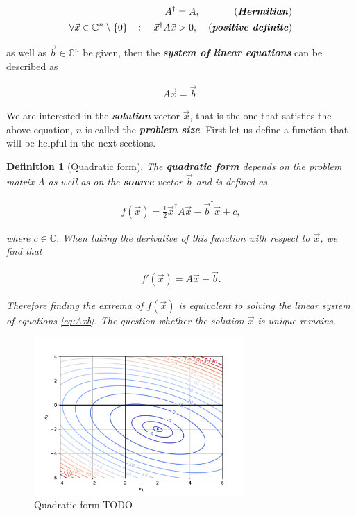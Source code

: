 \documentclass{article}
\theoremstyle{plain} %
\newtheorem{definition}{Definition}[section]
\theoremstyle{convention} %
\theoremstyle{remark} %
\def\df#1{\textbf{\textit{#1}}}
\numberwithin{equation}{section}
\begin{document}
\begin{align*}
    A^{\dagger} &= A, &\text{(\df{Hermitian})} \\
    \forall \vec{x} \in \mathbb{C}^n \setminus \{0\} \quad \colon \quad \vec{x}^{\dagger} A \vec{x} &> 0, &\text{(\df{positive definite})}
\end{align*}

as well as $\vec{b} \in \mathbb{C}^n$ be given, then the \df{system of linear equations} can be described as

\begin{align}
    A \vec{x} = \vec{b}. \label{eq:Axb}
\end{align}

We are interested in the \df{solution} vector $\vec{x}$, that is the one that satisfies the above equation, $n$ is called the \df{problem size}. First let us define a function that will be helpful in the next sections.

\begin{definition}[Quadratic form]

The \df{quadratic form} depends on the problem matrix $A$ as well as on the \df{source} vector $\vec{b}$ and is defined as

\begin{align*}
    f(\vec{x}) = \frac{1}{2} \vec{x}^{\dagger} A \vec{x} - \vec{b}^{\dagger} \vec{x} + c,
\end{align*}

where $c \in \mathbb{C}$. When taking the derivative of this function with respect to $\vec{x}$, we find that

\begin{align*}
    f'(\vec{x}) = A \vec{x} - \vec{b}.
\end{align*}

Therefore finding the extrema of $f(\vec{x})$ is equivalent to solving the linear system of equations \eqref{eq:Axb}. The question whether the solution $\vec{x}$ is unique remains.

\end{definition}

\begin{figure}
    \centering
    \includegraphics[width=8cm]{plots/qform_contour}
    \caption{Quadratic form TODO}
    \label{fig:qform}
\end{figure}
\end{document}
